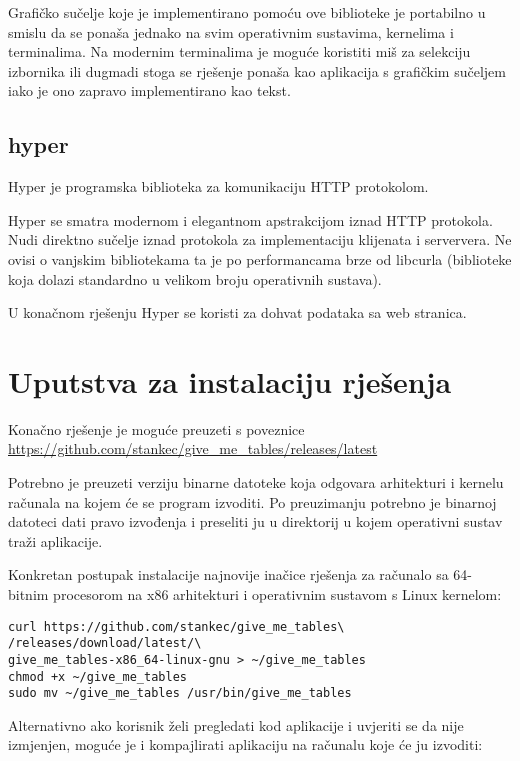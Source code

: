 \documentclass[times, utf8, zavrsni]{fer}
\begin{document}
Grafičko sučelje koje je implementirano pomoću ove biblioteke je portabilno u
smislu da se ponaša jednako na svim operativnim sustavima, kernelima i
terminalima. Na modernim terminalima je moguće koristiti miš za selekciju
izbornika ili dugmadi stoga se rješenje ponaša kao aplikacija s grafičkim
sučeljem iako je ono zapravo implementirano kao tekst.

\subsection{hyper}

Hyper \cite{hyper_repository} je programska biblioteka za komunikaciju HTTP
protokolom.

Hyper se smatra modernom i elegantnom apstrakcijom iznad HTTP protokola.
Nudi direktno sučelje iznad protokola za implementaciju klijenata i serververa.
Ne ovisi o vanjskim bibliotekama ta je po performancama brze od libcurla
(biblioteke koja dolazi standardno u velikom broju operativnih sustava).

U konačnom rješenju Hyper se koristi za dohvat podataka sa web stranica.

\section{Uputstva za instalaciju rješenja}

Konačno rješenje je moguće preuzeti s poveznice
\url{https://github.com/stankec/give_me_tables/releases/latest}

Potrebno je preuzeti verziju binarne datoteke koja odgovara arhitekturi i
kernelu računala na kojem će se program izvoditi. Po preuzimanju potrebno je
binarnoj datoteci dati pravo izvođenja i preseliti ju u direktorij u kojem
operativni sustav traži aplikacije.

Konkretan postupak instalacije najnovije inačice rješenja za računalo sa
64-bitnim procesorom na x86 arhitekturi i operativnim sustavom s Linux kernelom:

\begin{lstlisting}
curl https://github.com/stankec/give_me_tables\
/releases/download/latest/\
give_me_tables-x86_64-linux-gnu > ~/give_me_tables
chmod +x ~/give_me_tables
sudo mv ~/give_me_tables /usr/bin/give_me_tables
\end{lstlisting}

Alternativno ako korisnik želi pregledati kod aplikacije i uvjeriti se da nije
izmjenjen, moguće je i kompajlirati aplikaciju na računalu koje će ju izvoditi:
\end{document}
